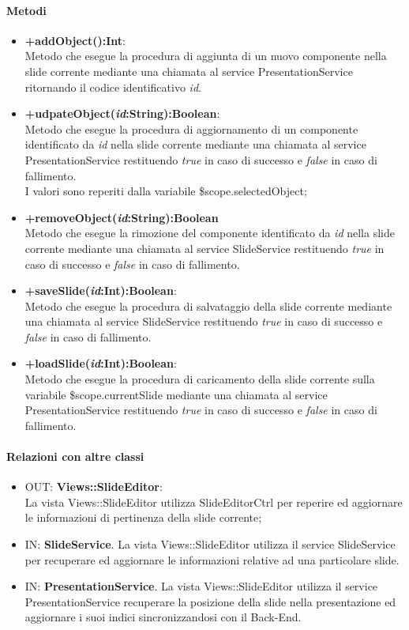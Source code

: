 	\paragraph{Metodi}
	\begin{itemize}
	  \item \textbf{+addObject():Int}:\\
		 Metodo che esegue la procedura di aggiunta di un nuovo componente nella slide corrente mediante una chiamata al service PresentationService ritornando il codice identificativo \textit{id}.
	  \item \textbf{+udpateObject(\textit{id}:String):Boolean}:\\
		 Metodo che esegue la procedura di aggiornamento di un componente  identificato da \textit{id} nella slide corrente mediante una chiamata al service PresentationService  restituendo \textit{true} in caso di successo e \textit{false} in caso di fallimento.\\I valori sono reperiti dalla variabile \$scope.selectedObject;
	  \item \textbf{+removeObject(\textit{id}:String):Boolean}\\
		 Metodo che esegue la rimozione del componente identificato da \textit{id} nella slide corrente mediante una chiamata al service SlideService  restituendo \textit{true} in caso di successo e \textit{false} in caso di fallimento.
	  \item \textbf{+saveSlide(\textit{id}:Int):Boolean}:\\
		 Metodo che esegue la procedura di salvataggio della slide corrente mediante una chiamata al service SlideService restituendo \textit{true} in caso di successo e \textit{false} in caso di fallimento.
	  \item \textbf{+loadSlide(\textit{id}:Int):Boolean}:\\
		 Metodo che esegue la procedura di caricamento della slide corrente sulla variabile \$scope.currentSlide mediante una chiamata al service PresentationService restituendo \textit{true} in caso di successo e \textit{false} in caso di fallimento.
	  	  
	\end{itemize}
	\paragraph{Relazioni con altre classi}
	\begin{itemize}
	  \item OUT: \textbf{Views::SlideEditor}:\\
		La vista Views::SlideEditor utilizza SlideEditorCtrl per reperire ed aggiornare le informazioni di pertinenza della slide corrente;	
	  \item IN: \textbf{SlideService}.
		La vista Views::SlideEditor utilizza il service SlideService per recuperare ed aggiornare le informazioni relative ad una particolare slide.	
	  \item IN: \textbf{PresentationService}.
		La vista Views::SlideEditor utilizza il service PresentationService recuperare la posizione della slide nella presentazione ed aggiornare i suoi indici sincronizzandosi con il Back-End.	
	\end{itemize}	
	
